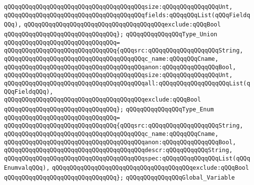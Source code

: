 \verb|qQQqqQQqqQQqqQQqqQQqqQQqqQQqqQQqqQQqqQQqsize:qQQqqQQqqQQqqQQqUnt,|\newline
\verb|qQQqqQQqqQQqqQQqqQQqqQQqqQQqqQQqqQQqqQQqfields:qQQqqQQqList(qQQqFieldqQQq),|\newline
\verb|qQQqqQQqqQQqqQQqqQQqqQQqqQQqqQQqqQQqqQQqexclude:qQQqBool|\newline
\verb|qQQqqQQqqQQqqQQqqQQqqQQqqQQqqQQq};|\newline
\newline
\verb|qQQqqQQqqQQqqQQqType_Union|\newline
\verb|qQQqqQQqqQQqqQQqqQQqqQQqqQQqqQQq=|\newline
\verb|qQQqqQQqqQQqqQQqqQQqqQQqqQQqqQQq{qQQqsrc:qQQqqQQqqQQqqQQqqQQqString,|\newline
\verb|qQQqqQQqqQQqqQQqqQQqqQQqqQQqqQQqqQQqqQQqc_name:qQQqqQQqCname,|\newline
\verb|qQQqqQQqqQQqqQQqqQQqqQQqqQQqqQQqqQQqqQQqanon:qQQqqQQqqQQqqQQqBool,|\newline
\verb|qQQqqQQqqQQqqQQqqQQqqQQqqQQqqQQqqQQqqQQqsize:qQQqqQQqqQQqqQQqUnt,|\newline
\verb|qQQqqQQqqQQqqQQqqQQqqQQqqQQqqQQqqQQqqQQqall:qQQqqQQqqQQqqQQqqQQqList(qQQqFieldqQQq),|\newline
\verb|qQQqqQQqqQQqqQQqqQQqqQQqqQQqqQQqqQQqqQQqexclude:qQQqBool|\newline
\verb|qQQqqQQqqQQqqQQqqQQqqQQqqQQqqQQq};|\newline
\newline
\verb|qQQqqQQqqQQqqQQqType_Enum|\newline
\verb|qQQqqQQqqQQqqQQqqQQqqQQqqQQqqQQq=|\newline
\verb|qQQqqQQqqQQqqQQqqQQqqQQqqQQqqQQq{qQQqsrc:qQQqqQQqqQQqqQQqqQQqString,|\newline
\verb|qQQqqQQqqQQqqQQqqQQqqQQqqQQqqQQqqQQqqQQqc_name:qQQqqQQqCname,|\newline
\verb|qQQqqQQqqQQqqQQqqQQqqQQqqQQqqQQqqQQqqQQqanon:qQQqqQQqqQQqqQQqBool,|\newline
\verb|qQQqqQQqqQQqqQQqqQQqqQQqqQQqqQQqqQQqqQQqdescr:qQQqqQQqqQQqString,|\newline
\verb|qQQqqQQqqQQqqQQqqQQqqQQqqQQqqQQqqQQqqQQqspec:qQQqqQQqqQQqqQQqList(qQQqEnumvalqQQq),|\newline
\verb|qQQqqQQqqQQqqQQqqQQqqQQqqQQqqQQqqQQqqQQqexclude:qQQqBool|\newline
\verb|qQQqqQQqqQQqqQQqqQQqqQQqqQQqqQQq};|\newline
\newline
\verb|qQQqqQQqqQQqqQQqGlobal_Variable|\newline
